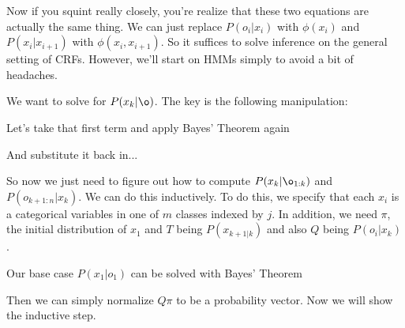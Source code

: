 \documentclass[12pt]{article}
\begin{document}
Now if you squint really closely, you're realize that these two equations are actually the same thing. We can just replace $P(o_i|x_i)$ with $\phi(x_i)$ and $P(x_i|x_{i+1})$ with $\phi(x_i, x_{i+1})$. So it suffices to solve inference on the general setting of CRFs. However, we'll start on HMMs simply to avoid a bit of headaches.

We want to solve for $P(x_k|\o)$. The key is the following manipulation:


Let's take that first term and apply Bayes' Theorem again


And substitute it back in...


So now we just need to figure out how to compute $P(x_k|\o_{1:k})$ and $P(o_{k+1:n}|x_k)$. We can do this inductively. To do this, we specify that each $x_i$ is a categorical variables in one of $m$ classes indexed by $j$. In addition, we need $\pi$, the initial distribution of $x_1$ and $T$ being $P(x_{k+1|k})$ and also $Q$ being $P(o_i|x_k)$. 

Our base case $P(x_1|o_1)$ can be solved with Bayes' Theorem


Then we can simply normalize $Q\pi$ to be a probability vector. Now we will show the inductive step.

\end{document}
